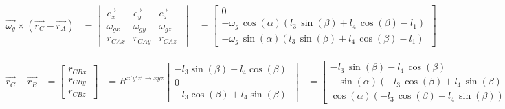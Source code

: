 \begin{equation*}
\begin{split}
\overrightarrow{\omega_{g}}\times(\overrightarrow{r_{C}}-\overrightarrow{r_{A}})
&=	\begin{vmatrix}
	\overrightarrow{e_{x}} & \overrightarrow{e_{y}} & \overrightarrow{e_{z}}\\
	\omega_{gx} & \omega_{gy} & \omega_{gz}\\
	r_{CAx} & r_{CAy} & r_{CAz}\
	\end{vmatrix}
&=	\begin{bmatrix}
	0\\
	-\omega_{g}\,\cos\left( \alpha \right)  \left( l_{3}\,\sin \left( \beta \right) +l_{4}\,\cos \left( \beta \right) -l_{1} \right)\\
	-\omega_{g}\,\sin \left( \alpha \right)  \left( l_{3}\,\sin \left( \beta \right) +l_{4}\,\cos \left( \beta \right) -l_{1} \right)\
	\end{bmatrix}
\end{split}
\end{equation*}

\begin{equation*}
\begin{split}
\overrightarrow{r_{C}}-\overrightarrow{r_{B}}
&=	\begin{bmatrix}
	r_{CBx}\\
	r_{CBy}\\
	r_{CBz}\
	\end{bmatrix}
&=	R^{x'y'z' \rightarrow xyz}
	\begin{bmatrix}
	-l_{3}\sin(\beta)-l_{4}\cos(\beta)\\
	0\\
	-l_{3}\cos(\beta)+l_{4}\sin(\beta)\
	\end{bmatrix}
&=	\begin{bmatrix}
	-l_{3}\,\sin \left( \beta \right) -l_{4}\,\cos \left( \beta \right) \\
	-\sin \left( \alpha\right)  \left( -l_{3}\,\cos \left( \beta \right) +l_{4}\,\sin\left( \beta \right)  \right) \\
	\cos \left( \alpha\right)  \left( -l_{3}\,\cos \left( \beta \right) +l_{4}\,\sin\left( \beta \right)  \right)\
	\end{bmatrix}
\end{split}
\end{equation*}

